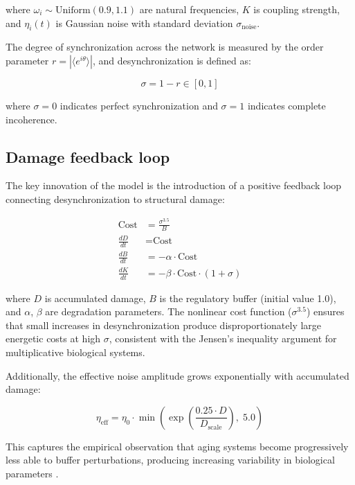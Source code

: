 \documentclass[12pt]{article}
\begin{document}
where $\omega_i \sim \text{Uniform}(0.9, 1.1)$ are natural frequencies, $K$ is
coupling strength, and $\eta_i(t)$ is Gaussian noise with standard deviation
$\sigma_\text{noise}$.

The degree of synchronization across the network is measured by the order
parameter $r = |\langle e^{i\theta} \rangle|$, and desynchronization is defined
as:

\begin{equation}
\sigma = 1 - r \in [0, 1]
\end{equation}

where $\sigma = 0$ indicates perfect synchronization and $\sigma = 1$ indicates
complete incoherence.

\subsection{Damage feedback loop}

The key innovation of the model is the introduction of a positive feedback loop
connecting desynchronization to structural damage:

\begin{align}
\text{Cost} &= \frac{\sigma^{3.5}}{B} \\[4pt]
\frac{dD}{dt} &= \text{Cost} \\[4pt]
\frac{dB}{dt} &= -\alpha \cdot \text{Cost} \\[4pt]
\frac{dK}{dt} &= -\beta \cdot \text{Cost} \cdot (1 + \sigma)
\end{align}

where $D$ is accumulated damage, $B$ is the regulatory buffer (initial value
1.0), and $\alpha$, $\beta$ are degradation parameters. The nonlinear cost
function ($\sigma^{3.5}$) ensures that small increases in desynchronization
produce disproportionately large energetic costs at high $\sigma$, consistent
with the Jensen's inequality argument for multiplicative biological systems.

Additionally, the effective noise amplitude grows exponentially with accumulated
damage:

\begin{equation}
\eta_\text{eff} = \eta_0 \cdot \min\!\left(\exp\!\left(\frac{0.25 \cdot D}{D_\text{scale}}\right),\; 5.0\right)
\end{equation}

This captures the empirical observation that aging systems become progressively
less able to buffer perturbations, producing increasing variability in biological
parameters \citep{pyrkov2021}.
\end{document}
